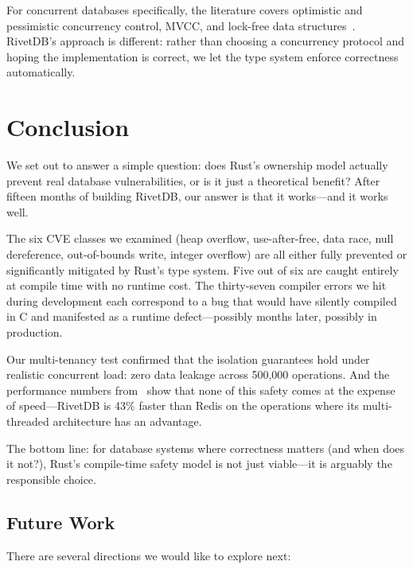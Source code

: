\documentclass[conference,a4paper]{IEEEtran}
\begin{document}
For concurrent databases specifically, the literature covers optimistic and pessimistic concurrency control, MVCC, and lock-free data structures~\cite{bernstein2015}. RivetDB's approach is different: rather than choosing a concurrency protocol and hoping the implementation is correct, we let the type system enforce correctness automatically.

\section{Conclusion}

We set out to answer a simple question: does Rust's ownership model actually prevent real database vulnerabilities, or is it just a theoretical benefit? After fifteen months of building RivetDB, our answer is that it works---and it works well.

The six CVE classes we examined (heap overflow, use-after-free, data race, null dereference, out-of-bounds write, integer overflow) are all either fully prevented or significantly mitigated by Rust's type system. Five out of six are caught entirely at compile time with no runtime cost. The thirty-seven compiler errors we hit during development each correspond to a bug that would have silently compiled in C and manifested as a runtime defect---possibly months later, possibly in production.

Our multi-tenancy test confirmed that the isolation guarantees hold under realistic concurrent load: zero data leakage across 500,000 operations. And the performance numbers from~\cite{shimpi2026rivetdb} show that none of this safety comes at the expense of speed---RivetDB is 43\% faster than Redis on the operations where its multi-threaded architecture has an advantage.

The bottom line: for database systems where correctness matters (and when does it not?), Rust's compile-time safety model is not just viable---it is arguably the responsible choice.

\subsection{Future Work}

There are several directions we would like to explore next:
\end{document}
